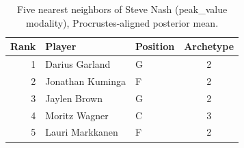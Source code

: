 \begin{table}[htbp]
  \centering\small
  \begin{tabular}{rllc}
    \toprule
    Rank & Player & Position & Archetype \\
    \midrule
    1 & Darius Garland & G & 2 \\
    2 & Jonathan Kuminga & F & 2 \\
    3 & Jaylen Brown & G & 2 \\
    4 & Moritz Wagner & C & 3 \\
    5 & Lauri Markkanen & F & 2 \\
    \bottomrule
  \end{tabular}
  \caption{Five nearest neighbors of Steve Nash (peak_value modality), Procrustes-aligned posterior mean.}
  \label{tab:Steve_Nash_neighbors_peak_value}
\end{table}


